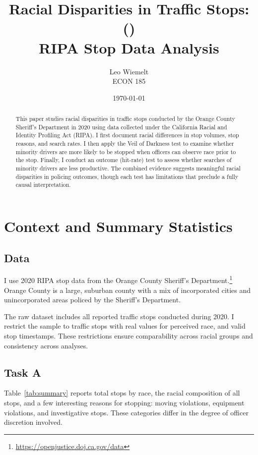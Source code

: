\documentclass[11pt]{article}
\title{\textbf{Racial Disparities in Traffic Stops:\\
\agency{} (\yr{})}\\[0.4em]
\large RIPA Stop Data Analysis}
\author{Leo Wiemelt\\
\small ECON 185}
\date{\today}
\newcommand{\agency}{Orange County Sheriff's Department}
\newcommand{\yr}{2020}
\begin{document}
\maketitle
\thispagestyle{empty}

\begin{abstract}
\noindent
This paper studies racial disparities in traffic stops conducted by the
Orange County Sheriff's Department in 2020 using data collected under the
California Racial and Identity Profiling Act (RIPA). I first document racial
differences in stop volumes, stop reasons, and search rates. I then apply the
Veil of Darkness test to examine whether minority drivers are more likely to be
stopped when officers can observe race prior to the stop. Finally, I conduct
an outcome (hit-rate) test to assess whether searches of minority drivers are
less productive. The combined evidence suggests meaningful racial disparities
in policing outcomes, though each test has limitations that preclude a fully
causal interpretation.
\end{abstract}

\bigskip

\section{Context and Summary Statistics}
\label{sec:summary}

\subsection*{Data}

I use \yr{} RIPA stop data from the \agency{}.\footnote{\url{https://openjustice.doj.ca.gov/data}}
Orange County is a large, suburban county with a mix of incorporated cities and unincorporated areas policed by the Sheriff’s Department.

The raw dataset includes all reported traffic stops conducted during 2020. I restrict the sample to traffic stops with real values for perceived race, and valid stop timestamps. These restrictions ensure comparability across racial groups and consistency across analyses.

\subsection*{Task A}

Table~\ref{tab:summary} reports total stops by race, the racial composition of
all stops, and a few interesting reasons for stopping: moving violations,
equipment violations, and investigative stops. These categories differ in the
degree of officer discretion involved.
\end{document}
